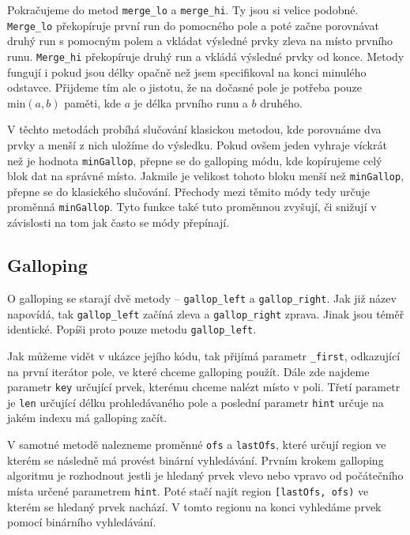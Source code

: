 \documentclass[thesis=B,czech]{FITthesis}[2019/12/23]
\begin{document}
Pokračujeme do metod \texttt{merge\_lo} a \texttt{merge\_hi}. Ty jsou si velice podobné. \texttt{Merge\_lo} překopíruje první run do pomocného pole a poté začne porovnávat druhý run s pomocným polem a vkládat výsledné prvky zleva na místo prvního runu. \texttt{Merge\_hi} překopíruje druhý run a vkládá výsledné prvky od konce. Metody fungují i pokud jsou délky opačně než jsem specifikoval na konci minulého odstavce. Přijdeme tím ale o jistotu, že na dočasné pole je potřeba pouze $ \textrm{min}(a,b) $ paměti, kde $a $ je délka prvního runu a $b$ druhého.

V těchto metodách probíhá slučování klasickou metodou, kde porovnáme dva prvky a menší z nich uložíme do výsledku. Pokud ovšem jeden vyhraje víckrát než je hodnota \texttt{minGallop}, přepne se do galloping módu, kde kopírujeme celý blok dat na správné místo. Jakmile je velikost tohoto bloku menší než \texttt{minGallop}, přepne se do klasického slučování. Přechody mezi těmito módy tedy určuje proměnná \texttt{minGallop}. Tyto funkce také tuto proměnnou zvyšují, či snižují v závislosti na tom jak často se módy přepínají.

\subsection{Galloping}

O galloping se starají dvě metody -- \texttt{gallop\_left} a \texttt{gallop\_right}. Jak již název napovídá, tak \texttt{gallop\_left} začíná zleva a \texttt{gallop\_right} zprava. Jinak jsou téměř identické. Popíši proto pouze metodu \texttt{gallop\_left}. 

Jak můžeme vidět v ukázce jejího kódu, tak přijímá parametr \texttt{\_first}, odkazující na první iterátor pole, ve které chceme galloping použít. Dále zde najdeme parametr \texttt{key} určující prvek, kterému chceme nalézt místo v poli. Třetí parametr je \texttt{len} určující délku prohledávaného pole a poslední parametr \texttt{hint} určuje na jakém indexu má galloping začít. 

V samotné metodě nalezneme proměnné \texttt{ofs} a \texttt{lastOfs}, které určují region ve kterém se následně má provést binární vyhledávání. Prvním krokem galloping algoritmu je rozhodnout jestli je hledaný prvek vlevo nebo vpravo od počátečního místa určené parametrem \texttt{hint}. Poté stačí najít region \texttt{[lastOfs, ofs)} ve kterém se hledaný prvek nachází. V tomto regionu na konci vyhledáme prvek pomocí binárního vyhledávání.
\end{document}
